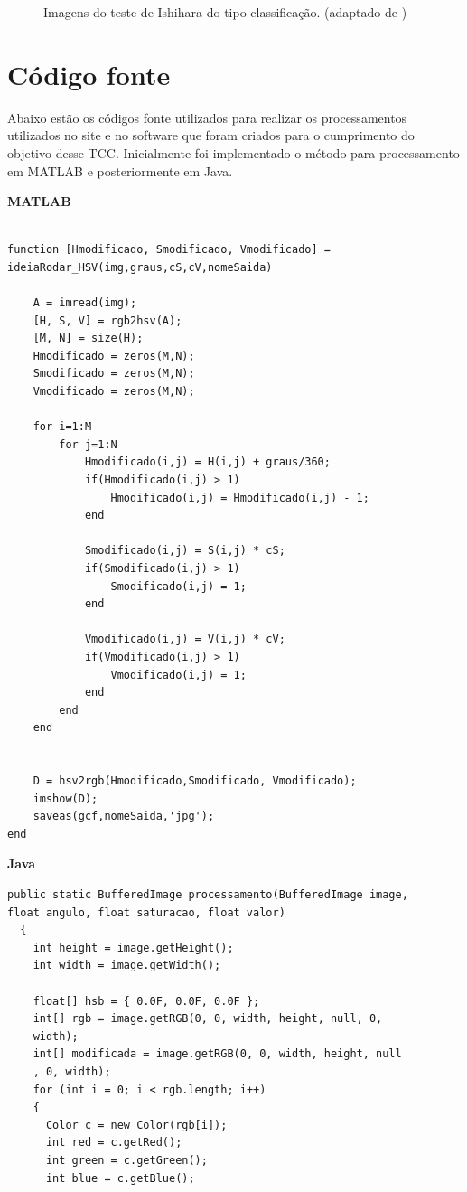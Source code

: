 \documentclass[	12pt, Times, openright, twoside, a4paper, english, brazil]{abntex2}
\begin{document}
\begin{apendicesenv}
\begin{figure}[!htb]
\caption{Imagens do teste de Ishihara do tipo classificação. (adaptado de )}
\label{fig:apendiceClassificacao}

\end{figure}

\chapter{Código fonte}
\label{ap:codigo}

Abaixo estão os códigos fonte utilizados para realizar os processamentos utilizados no site e no software que foram criados para o  cumprimento do objetivo desse TCC. Inicialmente foi implementado o método para processamento em MATLAB e posteriormente em Java.

\textbf{MATLAB}
\begin{lstlisting}

function [Hmodificado, Smodificado, Vmodificado] = 
ideiaRodar_HSV(img,graus,cS,cV,nomeSaida)

    A = imread(img);
    [H, S, V] = rgb2hsv(A);  
    [M, N] = size(H);    
    Hmodificado = zeros(M,N);
    Smodificado = zeros(M,N);
    Vmodificado = zeros(M,N);

    for i=1:M
        for j=1:N
            Hmodificado(i,j) = H(i,j) + graus/360;
            if(Hmodificado(i,j) > 1)
                Hmodificado(i,j) = Hmodificado(i,j) - 1;
            end
       
            Smodificado(i,j) = S(i,j) * cS;
            if(Smodificado(i,j) > 1)
                Smodificado(i,j) = 1;
            end
    
            Vmodificado(i,j) = V(i,j) * cV;
            if(Vmodificado(i,j) > 1)
                Vmodificado(i,j) = 1;
            end
        end
    end
        
    
    D = hsv2rgb(Hmodificado,Smodificado, Vmodificado);
    imshow(D);
    saveas(gcf,nomeSaida,'jpg');
end

\end{lstlisting}

\textbf{Java}
\begin{lstlisting}
public static BufferedImage processamento(BufferedImage image, 
float angulo, float saturacao, float valor)
  {
    int height = image.getHeight();
    int width = image.getWidth();
    
    float[] hsb = { 0.0F, 0.0F, 0.0F };
    int[] rgb = image.getRGB(0, 0, width, height, null, 0,
    width);
    int[] modificada = image.getRGB(0, 0, width, height, null
    , 0, width);
    for (int i = 0; i < rgb.length; i++)
    {
      Color c = new Color(rgb[i]);
      int red = c.getRed();
      int green = c.getGreen();
      int blue = c.getBlue();
      

\end{lstlisting}
\end{apendicesenv}
\end{document}
